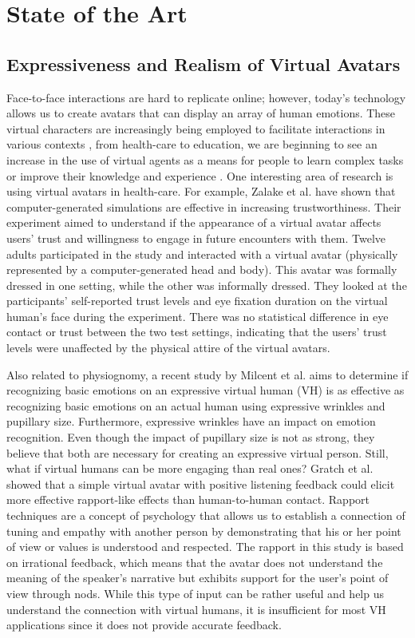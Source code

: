 \section{State of the Art}

\subsection{Expressiveness and Realism of Virtual Avatars}
Face-to-face interactions are hard to replicate online; however, today's technology allows us to create avatars that can display an array of human emotions. These virtual characters are increasingly being employed to facilitate interactions in various contexts \cite{NOW18}, from health-care to education, we are beginning to see an increase in the use of virtual agents as a means for people to learn complex tasks or improve their knowledge and experience \cite{MAR18, SHO19}. One interesting area of research is using virtual avatars in health-care. For example, Zalake et al. \cite{ZAL18} have shown that computer-generated simulations are effective in increasing trustworthiness. Their experiment aimed to understand if the appearance of a virtual avatar affects users' trust and willingness to engage in future encounters with them. Twelve adults participated in the study and interacted with a virtual avatar (physically represented by a computer-generated head and body). This avatar was formally dressed in one setting, while the other was informally dressed. They looked at the participants' self-reported trust levels and eye fixation duration on the virtual human's face during the experiment. There was no statistical difference in eye contact or trust between the two test settings, indicating that the users' trust levels were unaffected by the physical attire of the virtual avatars.

Also related to physiognomy, a recent study by Milcent et al. \cite{MIL19} aims to determine if recognizing basic emotions on an expressive virtual human (VH) is as effective as recognizing basic emotions on an actual human using expressive wrinkles and pupillary size. Furthermore, expressive wrinkles have an impact on emotion recognition. Even though the impact of pupillary size is not as strong, they believe that both are necessary for creating an expressive virtual person. 
Still, what if virtual humans can be more engaging than real ones? Gratch et al. \cite{GRA07} showed that a simple virtual avatar with positive listening feedback could elicit more effective rapport-like effects than human-to-human contact. Rapport techniques are a concept of psychology that allows us to establish a connection of tuning and empathy with another person by demonstrating that his or her point of view or values is understood and respected. The rapport in this study is based on irrational feedback, which means that the avatar does not understand the meaning of the speaker's narrative but exhibits support for the user's point of view through nods. While this type of input can be rather useful and help us understand the connection with virtual humans, it is insufficient for most VH applications since it does not provide accurate feedback. 

